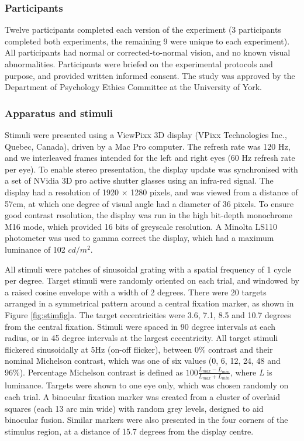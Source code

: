 \documentclass[]{article}
\begin{document}
\hypertarget{participants}{%
\subsubsection{Participants}\label{participants}}

Twelve participants completed each version of the experiment (3 participants completed both experiments, the remaining 9 were unique to each experiment). All participants had normal or corrected-to-normal vision, and no known visual abnormalities. Participants were briefed on the experimental protocols and purpose, and provided written informed consent. The study was approved by the Department of Psychology Ethics Committee at the University of York.

\hypertarget{apparatus-and-stimuli}{%
\subsubsection{Apparatus and stimuli}\label{apparatus-and-stimuli}}

Stimuli were presented using a ViewPixx 3D display (VPixx Technologies Inc., Quebec, Canada), driven by a Mac Pro computer. The refresh rate was 120 Hz, and we interleaved frames intended for the left and right eyes (60 Hz refresh rate per eye). To enable stereo presentation, the display update was synchronised with a set of NVidia 3D pro active shutter glasses using an infra-red signal. The display had a resolution of 1920 \(\times\) 1280 pixels, and was viewed from a distance of 57cm, at which one degree of visual angle had a diameter of 36 pixels. To ensure good contrast resolution, the display was run in the high bit-depth monochrome M16 mode, which provided 16 bits of greyscale resolution. A Minolta LS110 photometer was used to gamma correct the display, which had a maximum luminance of 102 \(cd/m^2\).

All stimuli were patches of sinusoidal grating with a spatial frequency of 1 cycle per degree. Target stimuli were randomly oriented on each trial, and windowed by a raised cosine envelope with a width of 2 degrees. There were 20 targets arranged in a symmetrical pattern around a central fixation marker, as shown in Figure \ref{fig:stimfig}a. The target eccentricities were 3.6, 7.1, 8.5 and 10.7 degrees from the central fixation. Stimuli were spaced in 90 degree intervals at each radius, or in 45 degree intervals at the largest eccentricity. All target stimuli flickered sinusoidally at 5Hz (on-off flicker), between 0\% contrast and their nominal Michelson contrast, which was one of six values (0, 6, 12, 24, 48 and 96\%). Percentage Michelson contrast is defined as \(100\frac{L_{max}-L_{min}}{L_{max}+L_{min}}\), where \emph{L} is luminance. Targets were shown to one eye only, which was chosen randomly on each trial. A binocular fixation marker was created from a cluster of overlaid squares (each 13 arc min wide) with random grey levels, designed to aid binocular fusion. Similar markers were also presented in the four corners of the stimulus region, at a distance of 15.7 degrees from the display centre.
\end{document}
